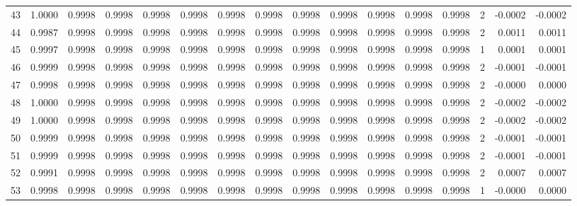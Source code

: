 \begin{tabular}{lrrrrrrrrrrrrrrr}
43  &      1.0000 &  0.9998 &  0.9998 &  0.9998 &  0.9998 &  0.9998 &  0.9998 &  0.9998 &  0.9998 &  0.9998 &   0.9998 &     0.9998 &      2 &                   -0.0002 &                    -0.0002 \\
44  &      0.9987 &  0.9998 &  0.9998 &  0.9998 &  0.9998 &  0.9998 &  0.9998 &  0.9998 &  0.9998 &  0.9998 &   0.9998 &     0.9998 &      2 &                    0.0011 &                     0.0011 \\
45  &      0.9997 &  0.9998 &  0.9998 &  0.9998 &  0.9998 &  0.9998 &  0.9998 &  0.9998 &  0.9998 &  0.9998 &   0.9998 &     0.9998 &      1 &                    0.0001 &                     0.0001 \\
46  &      0.9999 &  0.9998 &  0.9998 &  0.9998 &  0.9998 &  0.9998 &  0.9998 &  0.9998 &  0.9998 &  0.9998 &   0.9998 &     0.9998 &      2 &                   -0.0001 &                    -0.0001 \\
47  &      0.9998 &  0.9998 &  0.9998 &  0.9998 &  0.9998 &  0.9998 &  0.9998 &  0.9998 &  0.9998 &  0.9998 &   0.9998 &     0.9998 &      2 &                   -0.0000 &                     0.0000 \\
48  &      1.0000 &  0.9998 &  0.9998 &  0.9998 &  0.9998 &  0.9998 &  0.9998 &  0.9998 &  0.9998 &  0.9998 &   0.9998 &     0.9998 &      2 &                   -0.0002 &                    -0.0002 \\
49  &      1.0000 &  0.9998 &  0.9998 &  0.9998 &  0.9998 &  0.9998 &  0.9998 &  0.9998 &  0.9998 &  0.9998 &   0.9998 &     0.9998 &      2 &                   -0.0002 &                    -0.0002 \\
50  &      0.9999 &  0.9998 &  0.9998 &  0.9998 &  0.9998 &  0.9998 &  0.9998 &  0.9998 &  0.9998 &  0.9998 &   0.9998 &     0.9998 &      2 &                   -0.0001 &                    -0.0001 \\
51  &      0.9999 &  0.9998 &  0.9998 &  0.9998 &  0.9998 &  0.9998 &  0.9998 &  0.9998 &  0.9998 &  0.9998 &   0.9998 &     0.9998 &      2 &                   -0.0001 &                    -0.0001 \\
52  &      0.9991 &  0.9998 &  0.9998 &  0.9998 &  0.9998 &  0.9998 &  0.9998 &  0.9998 &  0.9998 &  0.9998 &   0.9998 &     0.9998 &      2 &                    0.0007 &                     0.0007 \\
53  &      0.9998 &  0.9998 &  0.9998 &  0.9998 &  0.9998 &  0.9998 &  0.9998 &  0.9998 &  0.9998 &  0.9998 &   0.9998 &     0.9998 &      1 &                   -0.0000 &                     0.0000 \\

\end{tabular}
